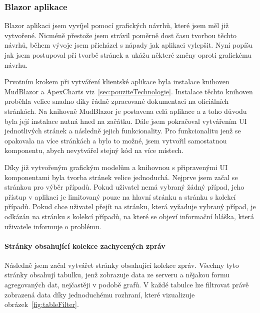     \subsubsection*{Blazor aplikace}
        Blazor aplikaci jsem vyvíjel pomocí grafických návrhů, které jsem měl již vytvořené. Nicméně přestože jsem strávil poměrně dost času tvorbou těchto návrhů, během vývoje jsem přicházel s nápady jak aplikaci vylepšit. Nyní popíšu jak jsem postupoval při tvorbě stránek a ukážu některé změny oproti grafickému návrhu.

        Prvotním krokem při vytváření klientské aplikace byla instalace knihoven MudBlazor a ApexCharts viz~\ref{sec:pouziteTechnologie}. Instalace těchto knihoven proběhla velice snadno díky řádně zpracované dokumentaci na oficiálních stránkách. Na knihovně MudBlazor je postavena celá aplikace a z toho důvodu byla její instalace nutná hned na začátku. Dále jsem pokračoval vytvářením \gls{UI} jednotlivých stránek a následně jejich funkcionality. Pro funkcionalitu jenž se opakovala na více stránkách a bylo to možné, jsem vytvořil samostatnou komponentu, abych nevytvářel stejný kód na více místech. 
        
        Díky již vytvořeným grafickým modelům a knihovnou s připravenými UI komponentami byla tvorba stránek velice jednoduchá. Nejprve jsem začal se stránkou pro výběr případů. Pokud uživatel nemá vybraný žádný případ, jeho přístup v aplikaci je limitovaný pouze na hlavní stránku a stránku s kolekcí případů. Pokud chce uživatel přejít na stránku, která vyžaduje vybraný případ, je odkázán na stránku s kolekcí případů, na které se objeví informační hláška, která uživatele informuje o problému.

        \paragraph{Stránky obsahující kolekce zachycených zpráv}
        Následně jsem začal vytvářet stránky obsahující kolekce zpráv. Všechny tyto stránky obsahují tabulku, jenž zobrazuje data ze serveru a nějakou formu agregovaných dat, nejčastěji v podobě grafů. V každé tabulce lze filtrovat právě zobrazená data díky jednoduchému rozhraní, které vizualizuje obrázek~\ref{fig:tableFilter}. 

